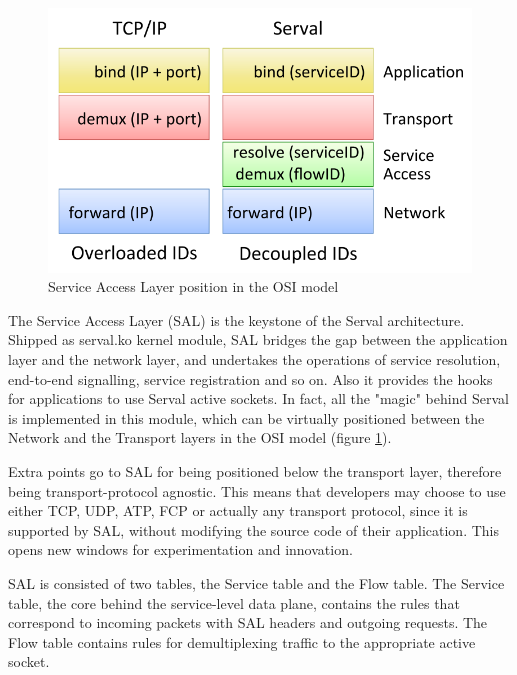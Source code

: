 \begin{figure}
\centering
{}
\includegraphics[scale=0.3]{figures/sal_position}
\caption[Service Access Layer position]{Service Access Layer position in the OSI model}
\label{fig:sal_position}
\end{figure}

The Service Access Layer (SAL) is the keystone of the Serval architecture.
Shipped as serval.ko kernel module, SAL bridges the gap between the application layer and the network layer, and undertakes the operations of service resolution, end-to-end signalling, service registration and so on.
Also it provides the hooks for applications to use Serval active sockets.
In fact, all the "magic" behind Serval is implemented in this module, which can be virtually positioned between the Network and the Transport layers in the OSI model (figure \ref{fig:sal_position}).

Extra points go to SAL for being positioned below the transport layer, therefore being transport-protocol agnostic.
This means that developers may choose to use either TCP, UDP, ATP, FCP or actually any transport protocol, since it is supported by SAL, without modifying the source code of their application.
This opens new windows for experimentation and innovation.

SAL is consisted of two tables, the Service table and the Flow table.
The Service table, the core behind the service-level data plane, contains the rules that correspond to incoming packets with SAL headers and outgoing requests.
The Flow table contains rules for demultiplexing traffic to the appropriate active socket.


